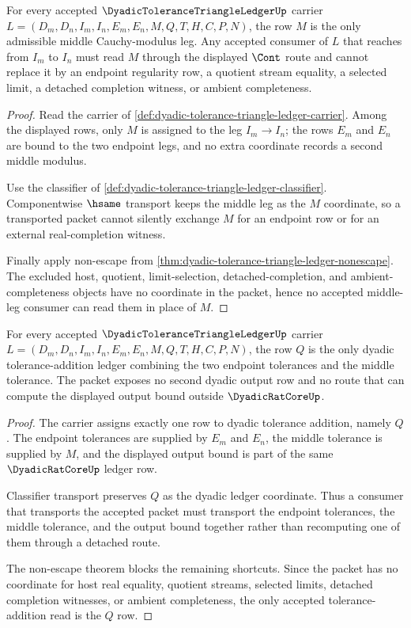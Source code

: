 \begin{theorem}
\label{thm:dyadic-tolerance-triangle-ledger-middle-leg-coverage}
For every accepted $\DyadicToleranceTriangleLedgerUp$ carrier $L=(D_m,D_n,I_m,I_n,E_m,E_n,M,Q,T,H,C,P,N)$, the row $M$ is the only admissible middle Cauchy-modulus leg. Any accepted consumer of $L$ that reaches from $I_m$ to $I_n$ must read $M$ through the displayed $\Cont$ route and cannot replace it by an endpoint regularity row, a quotient stream equality, a selected limit, a detached completion witness, or ambient completeness.
\end{theorem}
\begin{proof}
Read the carrier of \autoref{def:dyadic-tolerance-triangle-ledger-carrier}. Among the displayed rows, only $M$ is assigned to the leg $I_m \longrightarrow I_n$; the rows $E_m$ and $E_n$ are bound to the two endpoint legs, and no extra coordinate records a second middle modulus.

Use the classifier of \autoref{def:dyadic-tolerance-triangle-ledger-classifier}. Componentwise $\hsame$ transport keeps the middle leg as the $M$ coordinate, so a transported packet cannot silently exchange $M$ for an endpoint row or for an external real-completion witness.

Finally apply non-escape from \autoref{thm:dyadic-tolerance-triangle-ledger-nonescape}. The excluded host, quotient, limit-selection, detached-completion, and ambient-completeness objects have no coordinate in the packet, hence no accepted middle-leg consumer can read them in place of $M$.
\end{proof}

\begin{theorem}
\label{thm:dyadic-tolerance-triangle-ledger-tolerance-addition}
For every accepted $\DyadicToleranceTriangleLedgerUp$ carrier $L=(D_m,D_n,I_m,I_n,E_m,E_n,M,Q,T,H,C,P,N)$, the row $Q$ is the only dyadic tolerance-addition ledger combining the two endpoint tolerances and the middle tolerance. The packet exposes no second dyadic output row and no route that can compute the displayed output bound outside $\DyadicRatCoreUp$.
\end{theorem}
\begin{proof}
The carrier assigns exactly one row to dyadic tolerance addition, namely $Q$. The endpoint tolerances are supplied by $E_m$ and $E_n$, the middle tolerance is supplied by $M$, and the displayed output bound is part of the same $\DyadicRatCoreUp$ ledger row.

Classifier transport preserves $Q$ as the dyadic ledger coordinate. Thus a consumer that transports the accepted packet must transport the endpoint tolerances, the middle tolerance, and the output bound together rather than recomputing one of them through a detached route.

The non-escape theorem blocks the remaining shortcuts. Since the packet has no coordinate for host real equality, quotient streams, selected limits, detached completion witnesses, or ambient completeness, the only accepted tolerance-addition read is the $Q$ row.
\end{proof}

